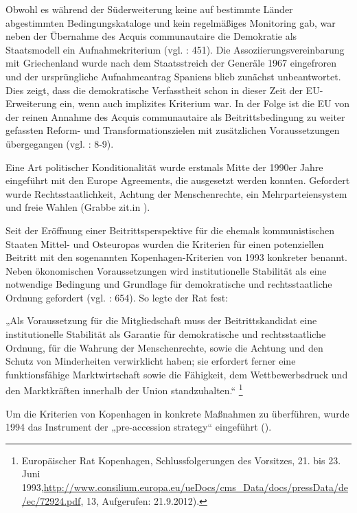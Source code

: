 Obwohl es während der Süderweiterung keine auf bestimmte Länder abgestimmten Bedingungskataloge und kein regelmäßiges Monitoring gab, war neben der Übernahme des Acquis communautaire die Demokratie als Staatsmodell ein Aufnahmekriterium (vgl. \cite{pridham07}: 451). Die Assoziierungsvereinbarung mit Griechenland wurde nach dem Staatsstreich der Generäle 1967 eingefroren und der ursprüngliche Aufnahmeantrag Spaniens blieb zunächst unbeantwortet. Dies zeigt, dass die demokratische Verfasstheit schon in dieser Zeit der EU-Erweiterung ein, wenn auch implizites Kriterium war. In der Folge ist die EU von der reinen Annahme des Acquis communautaire als Beitrittsbedingung zu weiter gefassten Reform- und Transformationszielen mit zusätzlichen Voraussetzungen übergegangen (vgl. \cite{dimit04}: 8-9).\par
Eine Art politischer Konditionalität wurde erstmals Mitte der 1990er Jahre eingeführt mit den Europe Agreements, die ausgesetzt werden konnten. Gefordert wurde Rechtsstaatlichkeit, Achtung der Menschenrechte, ein Mehrparteiensystem und freie Wahlen (Grabbe zit.in \cite{pridham07}).\par
Seit der Eröffnung einer Beitrittsperspektive für die ehemals kommunistischen Staaten Mittel- und Osteuropas wurden die Kriterien für einen potenziellen Beitritt mit den sogenannten Kopenhagen-Kriterien von 1993 konkreter benannt. Neben ökonomischen Voraussetzungen wird institutionelle Stabilität als eine notwendige Bedingung und Grundlage für demokratische und rechtsstaatliche Ordnung gefordert (vgl. \cite{kreile}: 654). So legte der Rat fest:\par

„Als Voraussetzung für die Mitgliedschaft muss der Beitrittskandidat eine institutionelle Stabilität als Garantie für demokratische und rechtsstaatliche Ordnung, für die Wahrung der Menschenrechte, sowie die Achtung und den Schutz von Minderheiten verwirklicht haben; sie erfordert ferner eine funktionsfähige Marktwirtschaft sowie die Fähigkeit, dem Wettbewerbsdruck und den Marktkräften innerhalb der Union standzuhalten.“ \footnote{Europäischer Rat Kopenhagen, Schlussfolgerungen des Vorsitzes, 21. bis 23. Juni 1993,\url{http://www.consilium.europa.eu/ueDocs/cms_Data/docs/pressData/de/ec/72924.pdf}, 13, Aufgerufen: 21.9.2012).}\par

Um die Kriterien von Kopenhagen in konkrete Maßnahmen zu überführen, wurde 1994 das Instrument der „pre-accession strategy“ eingeführt (\cite{lipsch}). \par

